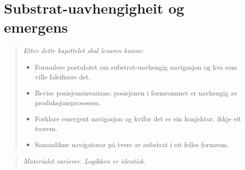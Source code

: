 

\chapter{Substrat-uavhengigheit og emergens}
\label{chap:substrat}

\begin{quote}\itshape
Etter dette kapittelet skal lesaren kunne:
\begin{itemize}[nosep]
\item Formulere postulatet om substrat-uavhengig navigasjon og kva som ville falsifisere det.
\item Bevise posisjonsinvarians: posisjonen i formrommet er uavhengig av produksjonsprosessen.
\item Forklare emergent navigasjon og kvifor det er ein konjektur, ikkje eit teorem.
\item Samanlikne navigatorar på tvers av substrat i eit felles formrom.
\end{itemize}
\end{quote}

\begin{quote}
\itshape
Materialet varierer. Logikken er identisk.
\end{quote}


